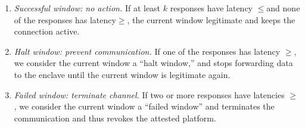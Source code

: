 \begin{enumerate}
  \item \emph{Successful window: no action.} If at least $k$ responses have latency $\leq$\connect and none of the responses has latency$\geq$\detach, the current window legitimate and \device keeps the connection active.
 
  \item \emph{Halt window: prevent communication.} If one of the responses has latency $\geq$\detach, we consider the current window a ``halt window,'' and \device stops forwarding data to the enclave until the current window is legitimate again.

  \item \emph{Failed window: terminate channel.} If two or more responses have latencies $\geq$\detach, we consider the current window a ``failed window'' and \device terminates the communication and thus revokes the attested platform.
\end{enumerate}